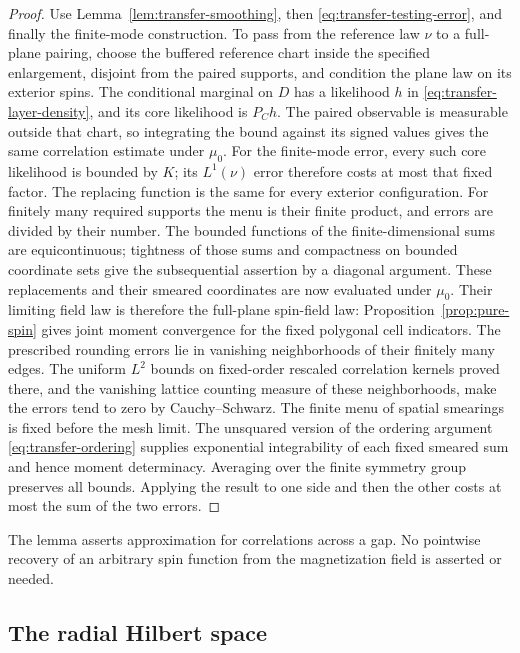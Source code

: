 \begin{proof}
Use Lemma~\ref{lem:transfer-smoothing}, then
\eqref{eq:transfer-testing-error}, and finally the finite-mode
construction.  To pass from the reference law $\nu$ to a full-plane
pairing, choose the buffered reference chart inside the specified
enlargement, disjoint from the paired supports, and condition the plane
law on its exterior spins.  The
conditional marginal on $D$ has a likelihood $h$ in
\eqref{eq:transfer-layer-density}, and its core likelihood is $P_Ch$.
The paired observable is measurable outside that chart, so integrating the bound
against its signed values gives the same correlation estimate under
$\mu_0$.  For the finite-mode error, every such core likelihood is
bounded by $K$; its $L^1(\nu)$ error therefore costs at most that fixed
factor.  The replacing function is the same for every exterior
configuration.  For finitely many required supports the menu is
their finite product, and errors are divided by their number.  The
bounded functions of the finite-dimensional sums are equicontinuous;
tightness of those sums and compactness on bounded coordinate sets give
the subsequential assertion by a diagonal argument.  These replacements
and their smeared coordinates are now evaluated under $\mu_0$.
Their limiting field law is therefore the full-plane spin-field law:
Proposition~\ref{prop:pure-spin} gives joint moment convergence for the
fixed polygonal cell indicators.  The
prescribed rounding errors lie in vanishing neighborhoods of their
finitely many edges.  The uniform $L^2$ bounds on fixed-order rescaled
correlation kernels proved there, and the vanishing lattice counting
measure of these neighborhoods, make the errors tend to zero by
Cauchy--Schwarz.  The finite menu of spatial smearings is fixed before
the mesh limit.  The unsquared version of the ordering argument
\eqref{eq:transfer-ordering} supplies exponential integrability of each
fixed smeared sum and hence moment determinacy.  Averaging over the
finite symmetry group preserves all bounds.  Applying the result to
one side and then the other costs at most the sum of the two errors.
\end{proof}

The lemma asserts approximation for correlations across a gap.  No
pointwise recovery of an arbitrary spin function from the magnetization
field is asserted or needed.

\subsection{The radial Hilbert space}

